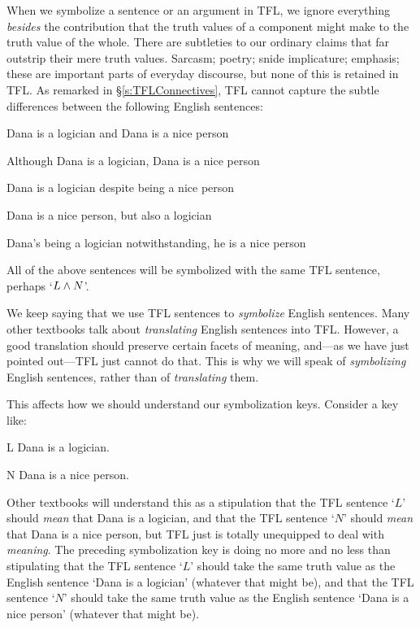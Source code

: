When we symbolize a sentence or an argument in TFL, we ignore everything \emph{besides} the contribution that the truth values of a component might make to the truth value of the whole. There are subtleties to our ordinary claims that far outstrip their mere truth values. Sarcasm; poetry; snide implicature; emphasis; these are important parts of everyday discourse, but none of this is retained in TFL. As remarked in \S\ref{s:TFLConnectives}, TFL cannot capture the subtle differences between the following English sentences:
	\begin{earg}
		\item Dana is a logician and Dana is a nice person
		\item Although Dana is a logician, Dana is a nice person
		\item Dana is a logician despite being a nice person
		\item Dana is a nice person, but also a logician
		\item Dana's being a logician notwithstanding, he is a nice person
	\end{earg}
All of the above sentences will be symbolized with the same TFL sentence, perhaps `$L \wedge N$'.

We keep saying that we use TFL sentences to \emph{symbolize} English sentences. Many other textbooks talk about \emph{translating} English sentences into TFL. However, a good translation should preserve certain facets of meaning, and---as we have just pointed out---TFL just cannot do that. This is why we will speak of \emph{symbolizing} English sentences, rather than of \emph{translating} them.

This affects how we should understand our symbolization keys. Consider a key like:
	\begin{ekey}
		\item[L] Dana is a logician.
		\item[N] Dana is a nice person.
	\end{ekey}
Other textbooks will understand this as a stipulation that the TFL sentence `$L$' should \emph{mean} that Dana is a logician, and that the TFL sentence `$N$' should \emph{mean} that Dana is a nice person, but TFL just is totally unequipped to deal with \emph{meaning}. The preceding symbolization key is doing no more and no less than stipulating that the TFL sentence `$L$' should take the same truth value as the English sentence `Dana is a logician' (whatever that might be), and that the TFL sentence `$N$' should take the same truth value as the English sentence `Dana is a nice person' (whatever that might be). 


